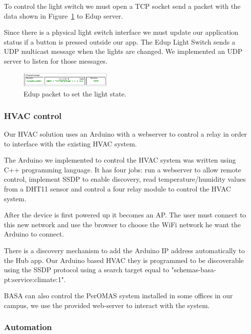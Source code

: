 \documentclass[conference]{IEEEtran}
\begin{document}
To control the light switch we must open a \ac{TCP} socket send a packet with the data shown in Figure~\ref{edup_imp} to Edup server.

Since there is a physical light switch interface we must update our application status if a button is pressed outside our app.
The Edup Light Switch sends a \ac{UDP} multicast message when the lights are changed. We implemented an \ac{UDP} server to listen for those messages. 



\begin{figure}[h]
\centering
\includegraphics[width=0.4\textwidth]{Figures/Edup_imp}
\caption{Edup packet to set the light state.}
\label{edup_imp}
\end{figure}




\subsubsection{HVAC control}

Our HVAC solution uses an Arduino with a webserver to control a relay in order to interface with the existing HVAC system.

The Arduino we implemented to control the HVAC system was written using C++ programming language. It has four jobs: run a webserver to allow remote control, implement \ac{SSDP} to enable discovery, read temperature/humidity values from a DHT11 sensor and control a four relay module to control the HVAC system.

After the device is first powered up it becomes an \ac{AP}. The user must connect to this new network and use the browser to choose the \ac{WiFi} network he want the Arduino to connect.

There is a discovery mechanism to add the Arduino IP address automatically to the Hub app. Our Arduino based HVAC they is programmed to be discoverable using the \ac{SSDP} protocol using a search target equal to "schemas-basa-pt:service:climate:1".

BASA can also control the PerOMAS system installed in some offices in our campus, we use the provided web-server to interact with the system.

\subsubsection{Automation}
\end{document}
